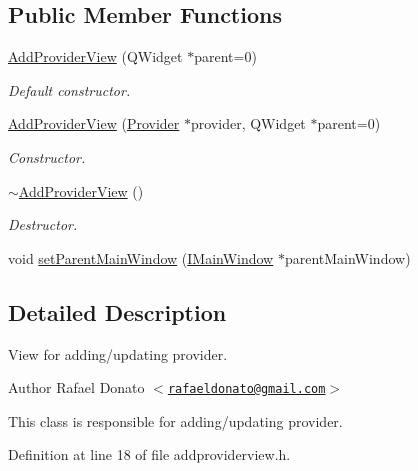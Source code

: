 \subsection*{\-Public \-Member \-Functions}
\begin{DoxyCompactItemize}
\item 
\hyperlink{class_add_provider_view_af0fe4c3371f09929c79ed099aa565f6a}{\-Add\-Provider\-View} (\-Q\-Widget $\ast$parent=0)
\begin{DoxyCompactList}\small\item\em \-Default constructor. \end{DoxyCompactList}\item 
\hyperlink{class_add_provider_view_a4c8881e3f532e992587b2bb1c82d51c1}{\-Add\-Provider\-View} (\hyperlink{class_provider}{\-Provider} $\ast$provider, \-Q\-Widget $\ast$parent=0)
\begin{DoxyCompactList}\small\item\em \-Constructor. \end{DoxyCompactList}\item 
\hyperlink{class_add_provider_view_a105e314c782a24e4ae8f98496e1c9c10}{$\sim$\-Add\-Provider\-View} ()
\begin{DoxyCompactList}\small\item\em \-Destructor. \end{DoxyCompactList}\item 
void \hyperlink{class_add_provider_view_a99dd1bac4547c35bfb62de45f0df4cc3}{set\-Parent\-Main\-Window} (\hyperlink{class_i_main_window}{\-I\-Main\-Window} $\ast$parent\-Main\-Window)
\end{DoxyCompactItemize}


\subsection{\-Detailed \-Description}
\-View for adding/updating provider. 

\begin{DoxyAuthor}{\-Author}
\-Rafael \-Donato $<$\href{mailto:rafaeldonato@gmail.com}{\tt rafaeldonato@gmail.\-com}$>$
\end{DoxyAuthor}
\-This class is responsible for adding/updating provider. 

\-Definition at line 18 of file addproviderview.\-h.



